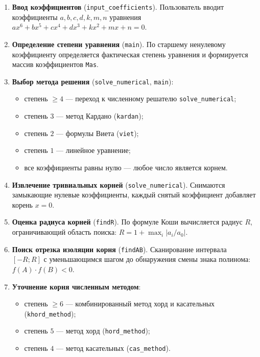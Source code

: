 \documentclass[a4paper,14pt]{extarticle}
\begin{document}
\begin{enumerate}
  \item \textbf{Ввод коэффициентов} (\texttt{input\_coefficients}). Пользователь вводит коэффициенты $a, b, c, d, k, m, n$ уравнения $ax^6 + bx^5 + cx^4 + dx^3 + kx^2 + mx + n = 0$.

  \item \textbf{Определение степени уравнения} (\texttt{main}). По старшему ненулевому коэффициенту определяется фактическая степень уравнения и формируется массив коэффициентов \texttt{Mas}.

  \item \textbf{Выбор метода решения} (\texttt{solve\_numerical}, \texttt{main}):
  \begin{itemize}
    \item степень $\geq 4$ --- переход к численному решателю \texttt{solve\_numerical};
    \item степень $3$ --- метод Кардано (\texttt{kardan});
    \item степень $2$ --- формулы Виета (\texttt{viet});
    \item степень $1$ --- линейное уравнение;
    \item все коэффициенты равны нулю --- любое число является корнем.
  \end{itemize}

  \item \textbf{Извлечение тривиальных корней} (\texttt{solve\_numerical}). Снимаются замыкающие нулевые коэффициенты, каждый снятый коэффициент добавляет корень $x = 0$.

  \item \textbf{Оценка радиуса корней} (\texttt{findR}). По формуле Коши вычисляется радиус $R$, ограничивающий область поиска: $R = 1 + \max_i |a_i / a_0|$.

  \item \textbf{Поиск отрезка изоляции корня} (\texttt{findAB}). Сканирование интервала $[-R; R]$ с уменьшающимся шагом до обнаружения смены знака полинома: $f(A) \cdot f(B) < 0$.

  \item \textbf{Уточнение корня численным методом}:
  \begin{itemize}
    \item степень $\geq 6$ --- комбинированный метод хорд и касательных (\texttt{khord\_method});
    \item степень $5$ --- метод хорд (\texttt{hord\_method});
    \item степень $4$ --- метод касательных (\texttt{cas\_method}).
  \end{itemize}


\end{enumerate}
\end{document}
